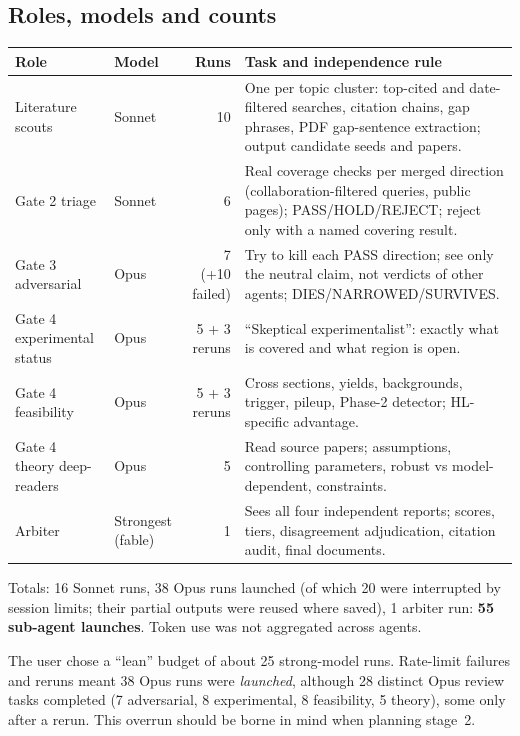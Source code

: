 \documentclass[11pt,a4paper]{article}
\begin{document}
\subsection{Roles, models and counts}
\begin{center}\small\begin{tabular}{@{}p{3.3cm}p{1.5cm}r p{7.2cm}@{}}\toprule Role & Model & Runs & Task and independence rule\\\midrule
Literature scouts & Sonnet & 10 & One per topic cluster: top-cited and date-filtered searches, citation chains, gap phrases, PDF gap-sentence extraction; output candidate seeds and papers.\\
Gate 2 triage & Sonnet & 6 & Real coverage checks per merged direction (collaboration-filtered queries, public pages); PASS/HOLD/REJECT; reject only with a named covering result.\\
Gate 3 adversarial & Opus & 7 (+10 failed) & Try to kill each PASS direction; see only the neutral claim, not verdicts of other agents; DIES/NARROWED/SURVIVES.\\
Gate 4 experimental status & Opus & 5 + 3 reruns & ``Skeptical experimentalist'': exactly what is covered and what region is open.\\
Gate 4 feasibility & Opus & 5 + 3 reruns & Cross sections, yields, backgrounds, trigger, pileup, Phase-2 detector; HL-specific advantage.\\
Gate 4 theory deep-readers & Opus & 5 & Read source papers; assumptions, controlling parameters, robust vs model-dependent, constraints.\\
Arbiter & Strongest (fable) & 1 & Sees all four independent reports; scores, tiers, disagreement adjudication, citation audit, final documents.\\
\bottomrule\end{tabular}\end{center}
Totals: 16 Sonnet runs, 38 Opus runs launched (of which 20 were interrupted by session limits; their partial outputs were reused where saved), 1 arbiter run: \textbf{55 sub-agent launches}. Token use was not aggregated across agents.
\begin{caution}The user chose a ``lean'' budget of about 25 strong-model runs. Rate-limit failures and reruns meant 38 Opus runs were \emph{launched}, although 28 distinct Opus review tasks completed (7 adversarial, 8 experimental, 8 feasibility, 5 theory), some only after a rerun. This overrun should be borne in mind when planning stage~2.\end{caution}
\end{document}

